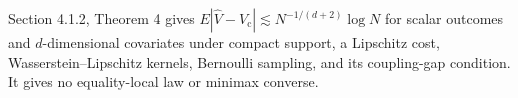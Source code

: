 Section 4.1.2, Theorem 4 gives \(E|\widehat V-V_{\mathrm c}|\lesssim N^{-1/(d+2)}\log N\) for scalar outcomes and \(d\)-dimensional covariates under compact support, a Lipschitz cost, Wasserstein--Lipschitz kernels, Bernoulli sampling, and its coupling-gap condition. It gives no equality-local law or minimax converse.